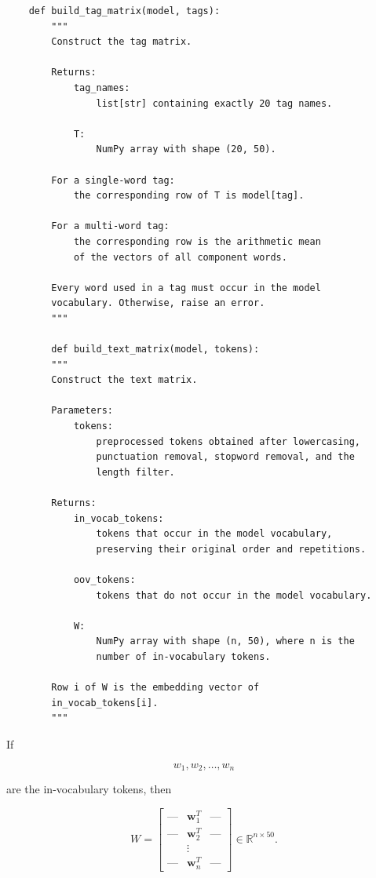 \documentclass[12pt]{article}
\begin{document}
\begin{lstlisting}
    def build_tag_matrix(model, tags):
        """
        Construct the tag matrix.

        Returns:
            tag_names:
                list[str] containing exactly 20 tag names.

            T:
                NumPy array with shape (20, 50).

        For a single-word tag:
            the corresponding row of T is model[tag].

        For a multi-word tag:
            the corresponding row is the arithmetic mean
            of the vectors of all component words.

        Every word used in a tag must occur in the model
        vocabulary. Otherwise, raise an error.
        """

        def build_text_matrix(model, tokens):
        """
        Construct the text matrix.

        Parameters:
            tokens:
                preprocessed tokens obtained after lowercasing,
                punctuation removal, stopword removal, and the
                length filter.

        Returns:
            in_vocab_tokens:
                tokens that occur in the model vocabulary,
                preserving their original order and repetitions.

            oov_tokens:
                tokens that do not occur in the model vocabulary.

            W:
                NumPy array with shape (n, 50), where n is the
                number of in-vocabulary tokens.

        Row i of W is the embedding vector of
        in_vocab_tokens[i].
        """
\end{lstlisting}

If

\[
w_1,w_2,\ldots,w_n
\]

are the in-vocabulary tokens, then

\[
W =
\begin{bmatrix}
\text{---} & \mathbf{w}_1^T & \text{---}\\
\text{---} & \mathbf{w}_2^T & \text{---}\\
    & \vdots          &    \\
\text{---} & \mathbf{w}_n^T & \text{---}
\end{bmatrix}
\in \mathbb{R}^{n\times 50}.
\]
\end{document}
